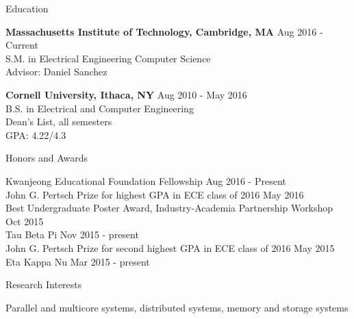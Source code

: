 \documentclass{resume} %
\begin{document}

\begin{rSection}{Education}

{\bf Massachusetts Institute of Technology, Cambridge, MA} \hfill { Aug 2016 - Current} \\ 
S.M. in Electrical Engineering Computer Science \\
Advisor: Daniel Sanchez

{\bf Cornell University, Ithaca, NY} \hfill { Aug 2010 - May 2016} \\ 
B.S. in Electrical and Computer Engineering \\
Dean's List, all semesters \\
GPA: 4.22/4.3 

\end{rSection}


\begin{rSection}{Honors and Awards}

Kwanjeong Educational Foundation Fellowship \hfill {Aug 2016 - Present} \\
John G. Pertsch Prize for highest GPA in ECE class of 2016 \hfill{May 2016} \\
Best Undergraduate Poster Award, Industry-Academia Partnership Workshop \hfill { Oct 2015} \\
Tau Beta Pi \hfill { Nov 2015 - present} \\
John G. Pertsch Prize for second highest GPA in ECE class of 2016 \hfill { May 2015} \\
Eta Kappa Nu \hfill { Mar 2015 - present} 

\end{rSection}


\begin{rSection}{Research Interests}

Parallel and multicore systems, distributed systems, memory and storage systems

\end{rSection}
\end{document}
